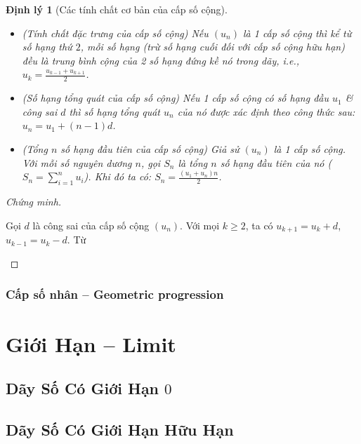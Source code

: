 \documentclass[oneside]{book}
\numberwithin{equation}{section}
\newtheorem{dinhly}{Định lý}[section]
\begin{document}
\begin{dinhly}[Các tính chất cơ bản của cấp số cộng]
	\begin{itemize}
		\item[(a)] \emph{(Tính chất đặc trưng của cấp số cộng)} Nếu $(u_n)$ là 1 cấp số cộng thì kể từ số hạng thứ $2$, mỗi số hạng (trừ số hạng cuối đối với cấp số cộng hữu hạn) đều là trung bình cộng của 2 số hạng đứng kề nó trong dãy, i.e., $u_k = \frac{u_{k-1} + u_{k+1}}{2}$.
		\item[(b)] \emph{(Số hạng tổng quát của cấp số cộng)} Nếu 1 cấp số cộng có số hạng đầu $u_1$ \& công sai $d$ thì số hạng tổng quát $u_n$ của nó được xác định theo công thức sau: $u_n = u_1 + (n - 1)d$.
		\item[(c)] \emph{(Tổng $n$ số hạng đầu tiên của cấp số cộng)} Giả sử $(u_n)$ là 1 cấp số cộng. Với mỗi số nguyên dương $n$, gọi $S_n$ là tổng $n$ số hạng đầu tiên của nó ($S_n = \sum_{i=1}^n u_i$). Khi đó ta có: $S_n = \frac{(u_1 + u_n)n}{2}$.
	\end{itemize}
\end{dinhly}

\begin{proof}[Chứng minh]
	\begin{enumerate*}
		\item[(a)] Gọi $d$ là công sai của cấp số cộng $(u_n)$. Với mọi $k\ge 2$, ta có $u_{k+1} = u_k + d$, $u_{k-1} = u_k - d$. Từ 
	\end{enumerate*}
\end{proof}

\subsection{Cấp số nhân -- Geometric progression}


\chapter{Giới Hạn -- Limit}

\section{Dãy Số Có Giới Hạn $0$}


\section{Dãy Số Có Giới Hạn Hữu Hạn}
\end{document}

